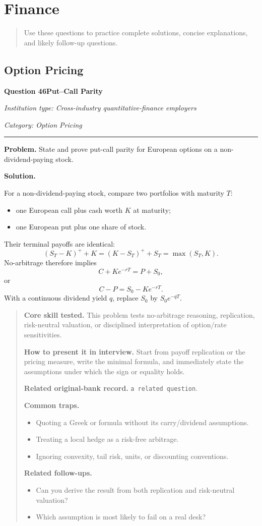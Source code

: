 \documentclass[11pt,letterpaper,openany]{book}
\newcommand{\ChapterIntro}[1]{%
  \begin{quote}\small #1\end{quote}%
}
\newenvironment{EditorialNote}
  {\begin{quote}\small\setlength{\parskip}{0.25em}}
  {\end{quote}}
\newcommand{\QuestionSpacer}{\vspace{0.4em}}
\newcommand{\FoundationQuestionHeader}[3]{%
  \vspace{1.0em}%
  {\large\bfseries #1\enspace #2\par}%
  {\small\itshape Institution type: Cross-industry quantitative-finance employers\par}%
  {\small\itshape Category: #3\par}%
  \vspace{0.25em}\hrule\vspace{0.45em}%
}
\begin{document}
\section{Finance}

\ChapterIntro{Use these questions to practice complete solutions, concise explanations, and likely follow-up questions.}

\subsection{Option Pricing}

\FoundationQuestionHeader{Question 46}{Put--Call Parity}{Option Pricing}

\textbf{Problem.} State and prove put-call parity for European options on a non-dividend-paying stock.


\textbf{Solution.}

For a non-dividend-paying stock, compare two portfolios with maturity \(T\):
\begin{itemize}
\item one European call plus cash worth \(K\) at maturity;
\item one European put plus one share of stock.
\end{itemize}
Their terminal payoffs are identical:
\[
(S_T-K)^++K=(K-S_T)^++S_T=\max(S_T,K).
\]
No-arbitrage therefore implies
\[
\boxed{C+Ke^{-rT}=P+S_0},
\]
or
\[
\boxed{C-P=S_0-Ke^{-rT}}.
\]
With a continuous dividend yield \(q\), replace \(S_0\) by \(S_0e^{-qT}\).


\begin{EditorialNote}


\textbf{Core skill tested.} This problem tests no-arbitrage reasoning, replication, risk-neutral valuation, or disciplined interpretation of option/rate sensitivities.


\textbf{How to present it in interview.} Start from payoff replication or the pricing measure, write the minimal formula, and immediately state the assumptions under which the sign or equality holds.


\textbf{Related original-bank record.} \texttt{a related question}.


\textbf{Common traps.}
\begin{itemize}
\item Quoting a Greek or formula without its carry/dividend assumptions.
\item Treating a local hedge as a risk-free arbitrage.
\item Ignoring convexity, tail risk, units, or discounting conventions.
\end{itemize}


\textbf{Related follow-ups.}
\begin{itemize}
\item Can you derive the result from both replication and risk-neutral valuation?
\item Which assumption is most likely to fail on a real desk?
\end{itemize}


\end{EditorialNote}
\QuestionSpacer
\end{document}
